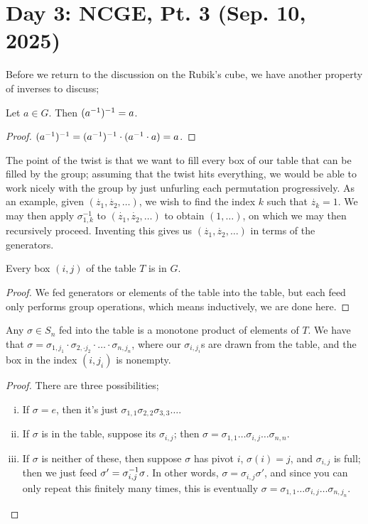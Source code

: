 \section{Day 3: NCGE, Pt. 3 (Sep. 10, 2025)}
Before we return to the discussion on the Rubik's cube, we have another property of inverses to discuss;
\begin{theorem}
    Let $a \in G$. Then $(a^{-1})^{-1} = a$.
\end{theorem}
\begin{proof}
    $(a^{-1})^{-1} = (a^{-1})^{-1} \cdot (a^{-1} \cdot a) = a$.
\end{proof}
\noindent The point of the twist is that we want to fill every box of our table that can be filled by the group; assuming that the twist hits everything, we would be able to work nicely with the group by just unfurling each permutation progressively. As an example, given $(\dot{z_1}, \dot{z_2}, \dots)$, we wish to find the index $k$ such that $\dot{z_k} = 1$. We may then apply $\sigma_{1,k}^{-1}$ to $(\dot{z_1}, \dot{z_2}, \dots)$ to obtain $(1, \dots)$, on which we may then recursively proceed. Inventing this gives us $(\dot{z_1}, \dot{z_2}, \dots)$ in terms of the generators.
\begin{lemma}
    Every box $(i, j)$ of the table $T$ is in $G$.
\end{lemma}
\begin{proof}
    We fed generators or elements of the table into the table, but each feed only performs group operations, which means inductively, we are done here.
\end{proof}
\begin{lemma}
    Any $\sigma \in S_n$ fed into the table is a monotone product of elements of $T$. We have that $\sigma = \sigma_{1, j_1} \cdot \sigma_{2, \cdot{j_2}} \cdot \dots \cdot \sigma_{n, j_n}$, where our $\sigma_{i, j_i}$s are drawn from the table, and the box in the index $(i, j_i)$ is nonempty.
\end{lemma}
\begin{proof}
    There are three possibilities;
    \begin{enumerate}[(i)]
        \item If $\sigma = e$, then it's just $\sigma_{1,1} \sigma_{2,2} \sigma_{3,3} \dots$.
        \item If $\sigma$ is in the table, suppose its $\sigma_{i,j}$; then $\sigma = \sigma_{1,1} \dots \sigma_{i,j} \dots \sigma_{n,n}$. 
        \item If $\sigma$ is neither of these, then suppose $\sigma$ has pivot $i$, $\sigma(i) = j$, and $\sigma_{i,j}$ is full; then we just feed $\sigma' = \sigma_{i,j}^{-1} \sigma$. In other words, $\sigma = \sigma_{i,j} \sigma'$, and since you can only repeat this finitely many times, this is eventually $\sigma = \sigma_{1,1} \dots \sigma_{i,j} \dots \sigma_{n,j_n}$. \qedhere
    \end{enumerate}
\end{proof}
